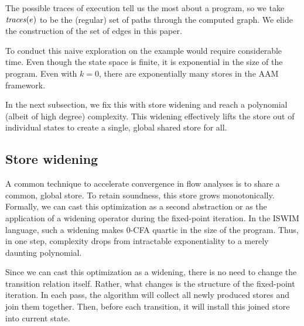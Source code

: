 \documentclass[preprint,onecolumn,9pt]{sigplanconf} %
\newcommand{\naive}{naive}
\begin{document}
The possible traces of execution tell us the most about a program, so
we take $\mathit{traces}(e)$ to be the (regular) set of paths through the
computed graph. We elide the construction of the set of edges in this paper.

To conduct this \naive{} exploration on the \Church{} example would require
considerable time.  Even though the state space is finite, it is exponential in
the size of the program.  Even with $k = 0$, there are exponentially many
stores in the AAM framework.

In the next subsection, we fix this with store widening and reach a polynomial
(albeit of high degree) complexity.
%
This widening effectively lifts the store out of individual states to create
a single, global shared store for all.


\subsection{Store widening}
\label{sec:storewiden}

A common technique to accelerate convergence in flow analyses is to share a
common, global store.
%
To retain soundness, this store grows monotonically.
%
Formally, we can cast this optimization as a second abstraction or as the
application of a widening operator during the fixed-point iteration.
%
In the ISWIM language, such a widening makes 0-CFA quartic in the size of the
program.
%
Thus, in one step, complexity drops from intractable exponentiality to a merely
daunting polynomial.

Since we can cast this optimization as a widening, there is no need to change
the transition relation itself.
%
Rather, what changes is the structure of the fixed-point iteration.
%
In each pass, the algorithm will collect all newly produced stores and join
them together.
%
Then, before each transition, it will install this joined store into current
state.
\end{document}
